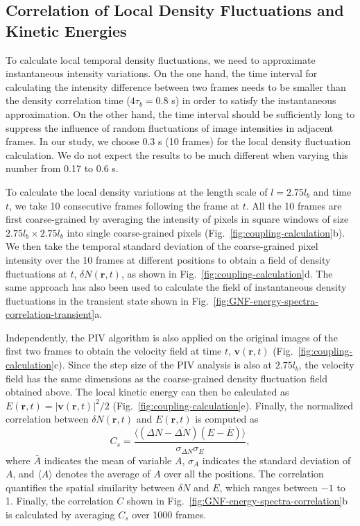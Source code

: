 \subsection{Correlation of Local Density Fluctuations and Kinetic Energies}

To calculate local temporal density fluctuations, we need to approximate instantaneous intensity variations. On the one hand, the time interval for calculating the intensity difference between two frames needs to be smaller than the density correlation time ($4\tau_b = 0.8$ s) in order to satisfy the instantaneous approximation. On the other hand, the time interval should be sufficiently long to suppress the influence of random fluctuations of image intensities in adjacent frames. In our study, we choose 0.3 s (10 frames) for the local density fluctuation calculation. We do not expect the results to be much different when varying this number from 0.17 to 0.6 s.

To calculate the local density variations at the length scale of $l = 2.75l_b$ and time $t$, we take 10 consecutive frames following the frame at $t$. All the 10 frames are first coarse-grained by averaging the intensity of pixels in square windows of size $2.75l_b \times 2.75l_b$ into single coarse-grained pixels (Fig.~\ref{fig:coupling-calculation}b). We then take the temporal standard deviation of the coarse-grained pixel intensity over the 10 frames at different positions to obtain a field of density fluctuations at $t$, $\delta N(\bm{r},t)$, as shown in Fig.~\ref{fig:coupling-calculation}d. The same approach has also been used to calculate the field of instantaneous density fluctuations in the transient state shown in Fig.~\ref{fig:GNF-energy-spectra-correlation-transient}a.

Independently, the PIV algorithm is also applied on the original images of the first two frames to obtain the velocity field at time $t$, $\bm{v}(\bm{r},t)$ (Fig.~\ref{fig:coupling-calculation}c). Since the step size of the PIV analysis is also at $2.75l_b$, the velocity field has the same dimensions as the coarse-grained density fluctuation field obtained above. The local kinetic energy can then be calculated as $E(\bm{r},t)=|\bm{v}(\bm{r},t)|^2/2$ (Fig.~\ref{fig:coupling-calculation}e). Finally, the normalized correlation between $\delta N(\bm{r},t)$ and $E(\bm{r},t)$ is computed as
\begin{equation}
C_s = \frac{\langle(\Delta N-\overline{\Delta N})(E-\overline{E})\rangle}{\sigma_{\Delta N}\sigma_{E}},
\end{equation}
where $\bar A$ indicates the mean of variable $A$, $\sigma_A$ indicates the standard deviation of $A$, and $\langle A \rangle$ denotes the average of $A$ over all the positions. The correlation quantifies the spatial similarity between $\delta N$ and $E$, which ranges between $-1$ to 1. Finally, the correlation $C$ shown in Fig.~\ref{fig:GNF-energy-spectra-correlation}b is calculated by averaging $C_s$ over 1000 frames.

